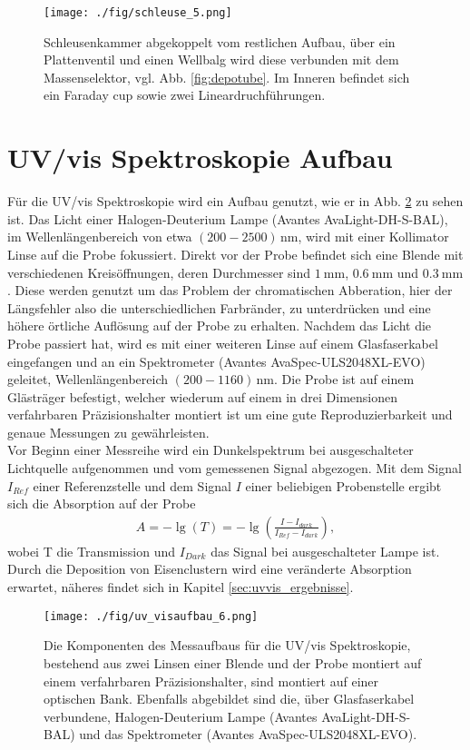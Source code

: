 \begin{figure}
    \centering
    \texttt{[image: ./fig/schleuse\_5.png]}
    \caption{Schleusenkammer abgekoppelt vom restlichen Aufbau, über ein Plattenventil und einen Wellbalg wird diese verbunden mit dem Massenselektor, vgl. Abb. \ref{fig:depotube}. Im Inneren befindet sich ein Faraday cup sowie zwei Lineardruchführungen.}
    \label{fig:schleuse}
\end{figure}


\section{UV/vis Spektroskopie Aufbau}
Für die UV/vis Spektroskopie wird ein Aufbau genutzt, wie er in Abb. \ref{fig:uv_visaufbau} zu sehen ist.
Das Licht einer Halogen-Deuterium Lampe (Avantes AvaLight-DH-S-BAL), im Wellenlängenbereich von etwa $(200-2500)\,$nm, wird mit einer Kollimator Linse auf die Probe fokussiert.
Direkt vor der Probe befindet sich eine Blende mit verschiedenen Kreisöffnungen, deren Durchmesser sind $\SI{1}{\milli\meter}$, $\SI{0,6}{\milli\meter}$ und $\SI{0,3}{\milli\meter}$.
Diese werden genutzt um das Problem der chromatischen Abberation, hier der Längsfehler also die unterschiedlichen Farbränder, zu unterdrücken und eine höhere örtliche Auflösung auf der Probe zu erhalten.
Nachdem das Licht die Probe passiert hat, wird es mit einer weiteren Linse auf einem Glasfaserkabel eingefangen und an ein Spektrometer (Avantes AvaSpec-ULS2048XL-EVO) geleitet, Wellenlängenbereich $(200-1160)\,$nm.
Die Probe ist auf einem Glästräger befestigt, welcher wiederum auf einem in drei Dimensionen verfahrbaren Präzisionshalter montiert ist um eine gute Reproduzierbarkeit und genaue Messungen zu gewährleisten.\\

Vor Beginn einer Messreihe wird ein Dunkelspektrum bei ausgeschalteter Lichtquelle aufgenommen und vom gemessenen Signal abgezogen. 
Mit dem Signal $I_{Ref}$ einer Referenzstelle und dem Signal $I$ einer beliebigen Probenstelle ergibt sich die Absorption auf der Probe
\begin{align}
    A=- \lg\left(T\right) = -\lg\left(\frac{I-I_{dark}}{I_{Ref}-I_{dark}}\right),
\end{align}
wobei T die Transmission und $I_{Dark}$ das Signal bei ausgeschalteter Lampe ist.
Durch die Deposition von Eisenclustern wird eine veränderte Absorption erwartet, näheres findet sich in Kapitel \ref{sec:uvvis_ergebnisse}.
\begin{figure}
    \centering
    \texttt{[image: ./fig/uv\_visaufbau\_6.png]}
    \caption{Die Komponenten des Messaufbaus für die UV/vis Spektroskopie, bestehend aus zwei Linsen einer Blende und der Probe montiert auf einem verfahrbaren Präzisionshalter, sind montiert auf einer optischen Bank. Ebenfalls abgebildet sind die, über Glasfaserkabel verbundene, Halogen-Deuterium Lampe (Avantes AvaLight-DH-S-BAL) und das Spektrometer (Avantes AvaSpec-ULS2048XL-EVO).}
    \label{fig:uv_visaufbau}
\end{figure}
